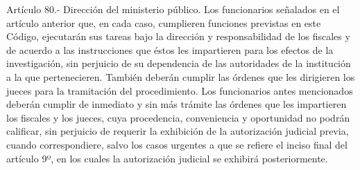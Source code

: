     Artículo 80.- Dirección del ministerio público. Los funcionarios señalados en el artículo anterior que, en cada caso, cumplieren funciones previstas en este Código, ejecutarán sus tareas bajo la dirección y responsabilidad de los fiscales y de acuerdo a las instrucciones que éstos les impartieren para los efectos de la investigación, sin perjuicio de su dependencia de las autoridades de la institución a la que pertenecieren.
    También deberán cumplir las órdenes que les dirigieren los jueces para la tramitación del procedimiento.
    Los funcionarios antes mencionados deberán cumplir de inmediato y sin más trámite las órdenes que les impartieren los fiscales y los jueces, cuya procedencia, conveniencia y oportunidad no podrán calificar, sin perjuicio de requerir la exhibición de la autorización judicial previa, cuando correspondiere, salvo los casos urgentes a que se refiere el inciso final del artículo 9º, en los cuales la autorización judicial se exhibirá posteriormente.

